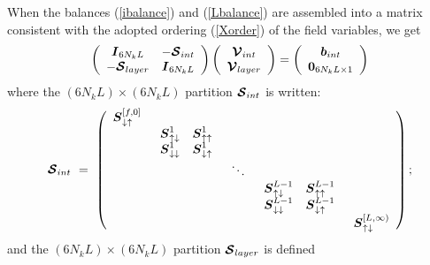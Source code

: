 When the balances (\ref{ibalance}) and (\ref{Lbalance}) are  assembled into a matrix 
consistent with the adopted ordering (\ref{Xorder}) of the field variables,
we get
\begin{equation} \label{Gbalance}
\left({\begin{array}{cc}
{\mbox{\boldmath$\mit I$\unboldmath}}_{6 N_k L}&-{\mbox{\boldmath$\cal S$\unboldmath}}_{{int}}\\ 
-{\mbox{\boldmath$\cal S$\unboldmath}}_{{layer}}&
{\mbox{\boldmath$\mit I$\unboldmath}}_{6 N_k L}\end{array}}\right)\left({\begin{array}{c}{\mbox{\boldmath$\cal V$\unboldmath}}_{{int}}\\ 
{\mbox{\boldmath$\cal V$\unboldmath}}_{{layer}}\end{array}}\right)=\left({\begin{array}{c}{\mbox{\boldmath$\mit b$\unboldmath}}_{{int}}\\ 
{\bf 0}_{6 N_k L \times 1}\end{array}}\right)
\end{equation} 
where the $(6 N_k L) \times (6 N_k L)$ partition ${\mbox{\boldmath$\cal S$\unboldmath}}_{{int}}$ is 
written:
\begin{equation} \label{Sint}
{\mbox{\boldmath$\cal S$\unboldmath}}_{{int}} \ =\ \left({\begin{array}{ccccc}
{\mbox{\boldmath$\mit S$\unboldmath}}_{\downarrow\uparrow}^{[f,0]}&&&&\\ 
&\begin{array}{cc}{\mbox{\boldmath$\mit S$\unboldmath}}_{\uparrow
\downarrow }^{1}&{\mbox{\boldmath$\mit S$\unboldmath}}_{\uparrow \uparrow }^{1}\\ 
{\mbox{\boldmath$\mit S$\unboldmath}}_{\downarrow
\downarrow }^{1}&{\mbox{\boldmath$\mit S$\unboldmath}}_{\downarrow \uparrow 
}^{1}\end{array}&&&\\ && \ddots
&&\\  &&&\begin{array}{cc}{\mbox{\boldmath$\mit S$\unboldmath}}_{\uparrow \downarrow 
}^{L-1}&{\mbox{\boldmath$\mit S$\unboldmath}}_{\uparrow \uparrow }^{L-1}\\ 
{\mbox{\boldmath$\mit S$\unboldmath}}_{\downarrow \downarrow 
}^{L-1}&{\mbox{\boldmath$\mit S$\unboldmath}}_{\downarrow \uparrow 
}^{L-1}\end{array}&\\ 
&&&&{\mbox{\boldmath$\mit S$\unboldmath}}_{\uparrow\downarrow}^{[L,\infty)}\end{array}}\right);
\end{equation}
and  the $(6 N_k L) \times (6 N_k L)$ partition ${\mbox{\boldmath$\cal S$\unboldmath}}_{{layer}}$ is 
defined
